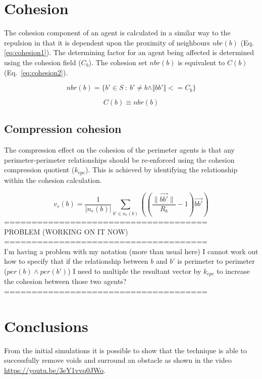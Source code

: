 \documentclass[12pt,a4paper]{article}
\newcommand{\magn}[1]{\Vert{#1}\Vert}
\newcommand{\card}[1]{\vert{#1}\vert}
\begin{document}
\section{Cohesion}\label{cohesion}

The cohesion component of an agent is calculated in a similar way to the repulsion in that it is dependent upon the proximity of neighbours $nbr(b)$ (Eq. \ref{eq:cohesion1}). The determining factor for an agent being affected is determined using the cohesion field ($C_b$). The cohesion set $nbr(b)$ is equivalent to $C(b)$ (Eq.~\ref{eq:cohesion2}).

\begin{equation}\label{eq:cohesion1}
nbr(b) = \{b' \in S~:~b' \neq b \land\magn{bb'} <= C_b\}
\end{equation}

\begin{equation}\label{eq:cohesion2}
C(b) \equiv nbr(b)
\end{equation}

\subsection{Compression cohesion}
The compression effect on the cohesion of the perimeter agents is that any perimeter-perimeter relationships should be re-enforced using the cohesion compression quotient ($k_{cpc}$). This is achieved by identifying the relationship within the cohesion calculation.


\begin{equation}\label{eq:cohesion3}
v_r(b) = \frac{1}{\lvert n_r(b)\rvert} \sum_{b' \in n_r(b)}\left(\left(\frac{\lVert\vec{b b'}\rVert}{R_b} - 1\right)\vec{b b'}\right)
\end{equation}
=====================================\\
PROBLEM (WORKING ON IT NOW)\\
=====================================\\
I'm having a problem with my notation (more than usual here) I cannot work out how to specify that if the relationship between $b$ and $b'$ is perimeter to perimeter ($per(b)\wedge per(b')$) I need to multiple the resultant vector by $k_{cpc}$ to increase the cohesion between those two agents?\\ 
=====================================\\

\section{Conclusions}\label{conclusions}
From the initial simulations it is possible to show that the technique is able to successfully remove voids and surround an obstacle as shown in the video \href{https://youtu.be/3eY1vvq0JWo}{https://youtu.be/3eY1vvq0JWo}.



\end{document}
